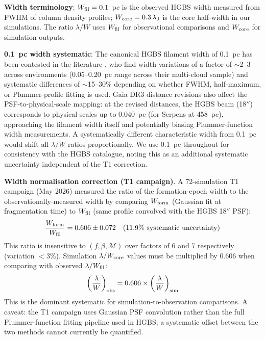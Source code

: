 \documentclass[twoside,twocolumn]{mnras}
\begin{document}
\textbf{Width terminology}: $W_{\rm fil} = 0.1$~pc is the observed HGBS width measured
from FWHM of column density profiles; $W_{\rm core} = 0.3\,\lambda_{\rm J}$ is the
core half-width in our simulations. The ratio $\lambda/W$ uses $W_{\rm fil}$ for
observational comparisons and $W_{\rm core}$ for simulation outputs.

\textbf{0.1~pc width systematic}: The canonical HGBS filament width of 0.1~pc has been
contested in the literature \citep{Panopoulou2022}, who find width variations of a factor of $\sim$2--3 across environments (0.05--0.20~pc range across their multi-cloud sample) and systematic differences of $\sim$15--30\% depending on whether FWHM, half-maximum, or Plummer-profile fitting is used. Gaia DR3 distance revisions also affect the PSF-to-physical-scale
mapping: at the revised distances, the HGBS beam (18$''$) corresponds to physical scales
up to $0.040$~pc (for Serpens at 458~pc), approaching the filament width itself and
potentially biasing Plummer-function width measurements. A systematically different
characteristic width from 0.1~pc would shift all $\lambda/W$ ratios proportionally.
We use 0.1~pc throughout for consistency with the HGBS catalogue, noting this as an
additional systematic uncertainty independent of the T1 correction.

\textbf{Width normalisation correction (T1 campaign)}.
\label{sec:width_correction}
A 72-simulation T1 campaign (May 2026) measured the ratio of the formation-epoch width
to the observationally-measured width by comparing $W_{\rm form}$ (Gaussian fit at
fragmentation time) to $W_{\rm fil}$ (same profile convolved with the HGBS 18$''$ PSF):
\begin{equation}
\frac{W_{\rm form}}{W_{\rm fil}} = 0.606 \pm 0.072 \quad (11.9\% \text{ systematic uncertainty})
\label{eq:t1_correction}
\end{equation}
This ratio is insensitive to $(f, \beta, \mathcal{M})$ over factors of 6 and 7
respectively (variation $<3\%$). Simulation $\lambda/W_{\rm core}$ values must be
multiplied by 0.606 when comparing with observed $\lambda/W_{\rm fil}$:
\begin{equation}
\left(\frac{\lambda}{W}\right)_{\rm obs} = 0.606 \times \left(\frac{\lambda}{W}\right)_{\rm sim}
\label{eq:t1_apply}
\end{equation}
This is the dominant systematic for simulation-to-observation comparisons. A caveat: the
T1 campaign uses Gaussian PSF convolution rather than the full Plummer-function fitting
pipeline used in HGBS; a systematic offset between the two methods cannot currently be
quantified.
\end{document}
